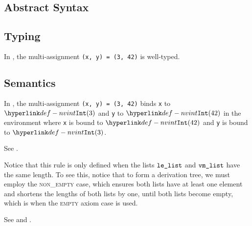 \subsection{Abstract Syntax}


\subsection{Typing}
In , the multi-assignment
\verb|(x, y) = (3, 42)| is well-typed.



\subsection{Semantics}
In , the multi-assignment \verb|(x, y) = (3, 42)| binds
\texttt{x} to $\nvint(3)$ and \texttt{y} to
$\nvint(42)$ in the environment where \texttt{x} is bound to $\nvint(42)$ and
\texttt{y} is bound to $\nvint(3)$.



See .


Notice that this rule is only defined when the lists $\texttt{le\_list}$ and $\texttt{vm\_list}$ have the same length.
To see this, notice that
to form a derivation tree, we must employ the \textsc{non\_empty} case, which ensures both lists
have at least one element and shortens the lengths of both lists by one,
until both lists become empty,
which is when the \textsc{empty} axiom case is used.

See 
and .

